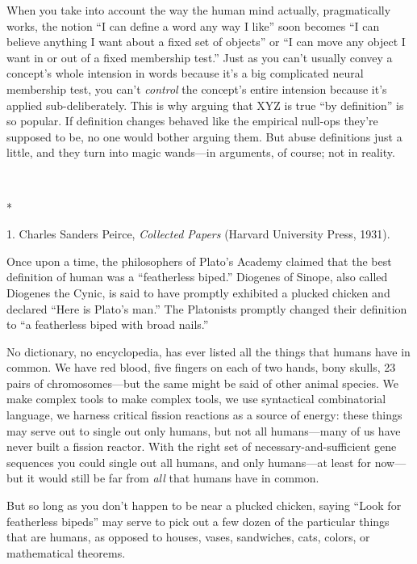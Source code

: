 {
 When you take into account the way the human mind actually,
pragmatically works, the notion ``I can define a word
any way I like'' soon becomes ``I
can believe anything I want about a fixed set of
objects'' or ``I can move any object
I want in or out of a fixed membership test.'' Just
as you can't usually convey a concept's
whole intension in words because it's a big complicated
neural membership test, you can't \textit{control} the
concept's entire intension because it's
applied sub-deliberately. This is why arguing that XYZ is true
``by definition'' is so popular. If
definition changes behaved like the empirical null-ops
they're supposed to be, no one would bother arguing
them. But abuse definitions just a little, and they turn into magic
wands---in arguments, of course; not in reality.}

{\centering
 \ ~
\par}

{\centering
 *
\par}


\bigskip

{
 1. Charles Sanders Peirce, \textit{Collected Papers} (Harvard
University Press, 1931).}


{
 Once upon a time, the philosophers of Plato's
Academy claimed that the best definition of human was a
``featherless biped.'' Diogenes of
Sinope, also called Diogenes the Cynic, is said to have promptly
exhibited a plucked chicken and declared ``Here is
Plato's man.'' The Platonists
promptly changed their definition to ``a featherless
biped with broad nails.'' }

{
 No dictionary, no encyclopedia, has ever listed all the things
that humans have in common. We have red blood, five fingers on each of
two hands, bony skulls, 23 pairs of chromosomes---but the same might be
said of other animal species. We make complex tools to make complex
tools, we use syntactical combinatorial language, we harness critical
fission reactions as a source of energy: these things may serve out to
single out only humans, but not all humans---many of us have never
built a fission reactor. With the right set of necessary-and-sufficient
gene sequences you could single out all humans, and only humans---at
least for now---but it would still be far from \textit{all} that humans
have in common.}

{
 But so long as you don't happen to be near a
plucked chicken, saying ``Look for featherless
bipeds'' may serve to pick out a few dozen of the
particular things that are humans, as opposed to houses, vases,
sandwiches, cats, colors, or mathematical theorems.}

